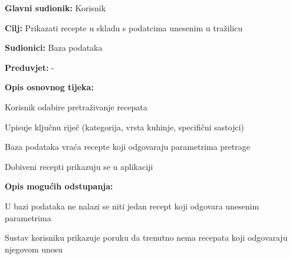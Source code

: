 					\noindent {}
					\begin{packed_item}
						
						\item \textbf{Glavni sudionik: }Korisnik
						\item \textbf{Cilj: }Prikazati recepte u skladu s podatcima unesenim u tražilicu
						\item \textbf{Sudionici: }Baza podataka
						\item \textbf{Preduvjet: }-
						\item \textbf{Opis osnovnog tijeka:}
						
						\item[] \begin{packed_enum}
							\item Korisnik odabire pretraživanje recepata
							\item Upisuje ključnu riječ (kategorija, vrsta kuhinje, specifični sastojci)
							\item Baza podataka vraća recepte koji odgovaraju parametrima pretrage
							\item Dobiveni recepti prikazuju se u aplikaciji
						\end{packed_enum}
						\item \textbf{Opis mogućih odstupanja:}
						\item[] \begin{packed_enum}
							\item[3.a] U bazi podataka ne nalazi se niti jedan recept koji odgovara unesenim parametrima
							\begin{packed_enum}
								\item[1.] Sustav korisniku prikazuje poruku da trenutno nema recepata koji odgovaraju njegovom unosu
							\end{packed_enum}
						\end{packed_enum}
					\end{packed_item}
					
